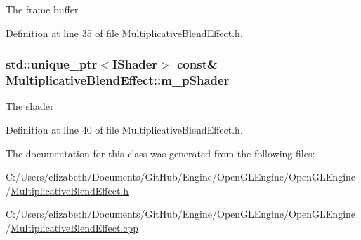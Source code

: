 The frame buffer 



Definition at line 35 of file Multiplicative\+Blend\+Effect.\+h.

\subsubsection[{\texorpdfstring{m\+\_\+p\+Shader}{m_pShader}}]{\setlength{\rightskip}{0pt plus 5cm}std\+::unique\+\_\+ptr$<${\bf I\+Shader}$>$ const\& Multiplicative\+Blend\+Effect\+::m\+\_\+p\+Shader\hspace{0.3cm}{\ttfamily [private]}}\hypertarget{class_multiplicative_blend_effect_a32258366995f3ff069b7ee81506c0118}{}\label{class_multiplicative_blend_effect_a32258366995f3ff069b7ee81506c0118}


The shader 



Definition at line 40 of file Multiplicative\+Blend\+Effect.\+h.



The documentation for this class was generated from the following files\+:\begin{DoxyCompactItemize}
\item 
C\+:/\+Users/elizabeth/\+Documents/\+Git\+Hub/\+Engine/\+Open\+G\+L\+Engine/\+Open\+G\+L\+Engine/\hyperlink{_multiplicative_blend_effect_8h}{Multiplicative\+Blend\+Effect.\+h}\item 
C\+:/\+Users/elizabeth/\+Documents/\+Git\+Hub/\+Engine/\+Open\+G\+L\+Engine/\+Open\+G\+L\+Engine/\hyperlink{_multiplicative_blend_effect_8cpp}{Multiplicative\+Blend\+Effect.\+cpp}\end{DoxyCompactItemize}
